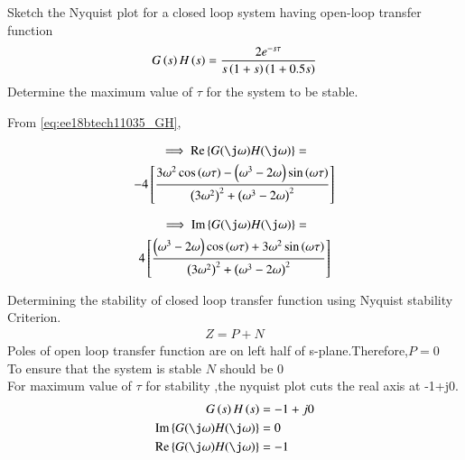 
Sketch the Nyquist plot for a closed loop system having open-loop transfer function 
\begin{align}
\label{eq:ee18btech11035_GH}
    G\left(s\right)H\left(s\right)=\frac{2e^{-s\tau}}{s\left(1+s\right)\left(1+0.5s\right)}
\end{align}
Determine the maximum value of $\tau$ for the system to be stable.

\solution 
From \eqref{eq:ee18btech11035_GH},

\begin{multline}
\label{eq:ee18btech11035_Re}
\implies  \text{Re} \cbrak{G(\j\omega)H(\j\omega)} =
\\
-4\sbrak{\frac{3\omega^2\cos\brak{\omega\tau}-\brak{\omega^3-2\omega}\sin\brak{\omega\tau}}{  \brak{3\omega^2}^2+ \brak{\omega^3-2\omega}^2  }}
\end{multline}

\begin{multline}
\label{eq:ee18btech11035_Im}
\implies  \text{Im} \cbrak{G(\j\omega)H(\j\omega)} =
\\
4\sbrak{\frac{\brak{\omega^3-2\omega}\cos\brak{\omega\tau}+3\omega^2\sin\brak{\omega\tau}}{  \brak{3\omega^2}^2+ \brak{\omega^3-2\omega}^2  }}
\end{multline}

Determining the stability of closed loop transfer function using Nyquist stability Criterion.\\
\begin{align}
    Z=P+N
\end{align}
Poles of open loop transfer function are on left half of s-plane.Therefore,$P=0$\\
To ensure that the system is stable $N$ should be 0\\
For maximum value of $\tau$ for stability ,the nyquist plot cuts the real axis at -1+j0.\\
\begin{align}
    G\brak{s}H\brak{s} &= -1+j0\\
    \label{eq:ee18btech11035_im0}
    \text{Im} \cbrak{G(\j\omega)H(\j\omega)} &= 0\\
    \label{eq:ee18btech11035_Re0}
    \text{Re} \cbrak{G(\j\omega)H(\j\omega)} &= -1
\end{align}

